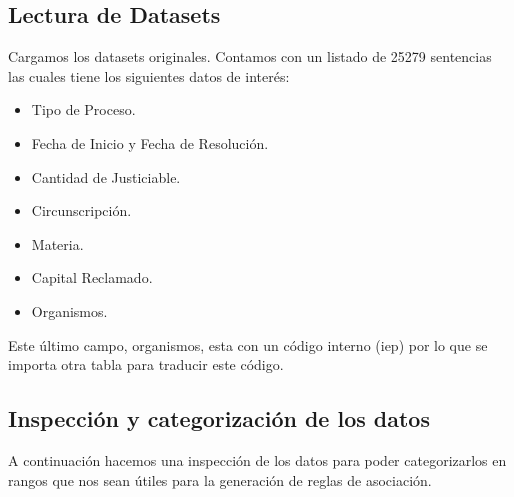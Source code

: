 \documentclass[runningheads,a4paper]{llncs}
\newenvironment{Shaded}{\footnotesize}{}
\newcommand{\KeywordTok}[1]{\textcolor[rgb]{0.00,0.44,0.13}{\textbf{{#1}}}}
\newcommand{\StringTok}[1]{\textcolor[rgb]{0.25,0.44,0.63}{{#1}}}
\newcommand{\CommentTok}[1]{\textcolor[rgb]{0.38,0.63,0.69}{\textit{{#1}}}}
\newcommand{\NormalTok}[1]{{#1}}
\newcommand{\OperatorTok}[1]{\textcolor[rgb]{0.40,0.40,0.40}{{#1}}}
\def\tightlist{} %
\begin{document}
\subsection{Lectura de Datasets}\label{lectura-de-datasets}

Cargamos los datasets originales. Contamos con un listado de 25279
sentencias las cuales tiene los siguientes datos de interés:

\begin{itemize}
\tightlist
\item
  Tipo de Proceso.
\item
  Fecha de Inicio y Fecha de Resolución.
\item
  Cantidad de Justiciable.
\item
  Circunscripción.
\item
  Materia.
\item
  Capital Reclamado.
\item
  Organismos.
\end{itemize}

Este último campo, organismos, esta con un código interno (iep) por lo
que se importa otra tabla para traducir este código.

\begin{Shaded}
\end{Shaded}

\subsection{Inspección y categorización de los
datos}\label{inspeccion-y-categorizacion-de-los-datos}

A continuación hacemos una inspección de los datos para poder
categorizarlos en rangos que nos sean útiles para la generación de
reglas de asociación.
\end{document}
